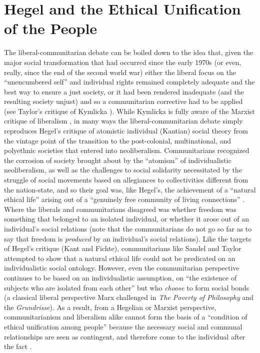 \documentclass[12pt,oneside]{memoir}
\begin{document}
\section*{Hegel and the Ethical Unification of the People}

The liberal-communitarian debate can be boiled down to the idea that, given the major social transformation that had occurred since the early 1970s (or even, really, since the end of the second world war) either the liberal focus on the ``unencumbered self'' \citep{Sandel1984} and individual rights remained completely adequate and the best way to ensure a just society, or it had been rendered inadequate (and the resulting society unjust) and so a communitarian corrective had to be applied (see Taylor's critique of Kymlicka \cite{TaylorKymlicka}). While Kymlicka is fully aware of the Marxist critique of liberalism \citep{Kymlicka1989}, in many ways the liberal-communitarian debate simply reproduces Hegel's critique of atomistic individual (Kantian) social theory from the vintage point of the transition to the post-colonial, multinational, and polyethnic societies that entered into neoliberalism. Communitarians recognized the corrosion of society brought about by the ``atomism'' of individualistic neoliberalism, as well as the challenges to social solidarity necessitated by the struggle of social movements based on allegiances to collectivities different from the nation-state, and so their goal was, like Hegel's, the achievement of a ``natural ethical life'' \citep[102]{Hegel1979} arising out of a ``genuinely free community of living connections'' \citep[145]{Hegel1977}. Where the liberals and communitarians disagreed was whether freedom was something that belonged to an isolated individual, or whether it arose out of an individual's social relations (note that the communitarians do not go so far as to say that freedom is \textit{produced} by an individual's social relations). Like the targets of Hegel's critique (Kant and Fichte), communitarians like Sandel and Taylor attempted to show that a natural ethical life could not be predicated on an individualistic social ontology. However, even the communitarian perspective continues to be based on an individualistic assumption, on ``the existence of subjects who are isolated from each other'' but who \textit{choose }to form social bonds (a classical liberal perspective Marx challenged in \textit{The Poverty of Philosophy }and the \textit{Grundrisse}). As a result, from a Hegelian or Marxist perspective, communitarianism and liberalism alike cannot form the basis of a ``condition of ethical unification among people'' because the necessary social and communal relationships are seen as contingent, and therefore come to the individual after the fact \citep[12]{honneth-struggle}.
\end{document}
